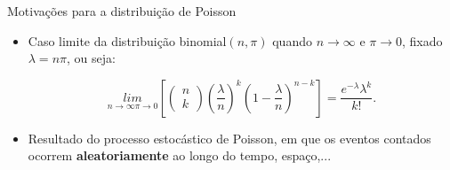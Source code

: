 \documentclass[10pt, aspectratio=169]{beamer}
\begin{document}



\begin{frame}{Motivações para a distribuição de Poisson}
    


    \vspace{0,5cm}
    
    \begin{itemize}
        \item Caso limite da distribuição binomial$(n, \pi)$ quando $n\rightarrow \infty$ e $\pi\rightarrow 0$, fixado $\lambda=n\pi$, ou seja:

\vspace{0.4cm}

$$
     \underset{n \to \infty  \pi \to 0 }{lim}
\left [ \begin{pmatrix}
 n\\k 
\end{pmatrix} \left ( \frac{\lambda}{n} \right )^{k}\left ( 1-\frac{\lambda}{n} \right )^{n-k}\right ]=\frac{e^{-\lambda}\lambda^{k}}{k!}.
$$

    \vspace{0,5cm}

        \item Resultado do processo estocástico de Poisson, em que os eventos contados ocorrem \textbf{aleatoriamente} ao longo do tempo, espaço,...

    \end{itemize}
    
\end{frame}


\end{document}
